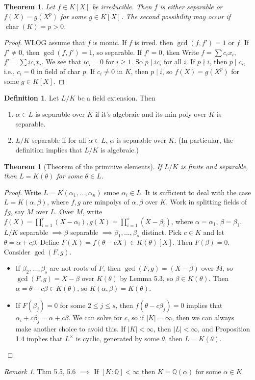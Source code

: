\documentclass{article}
\theoremstyle{definition}
\newtheorem*{defn*}{Definition}
\theoremstyle{remark}
\newtheorem{rem}{Remark}
\theoremstyle{plain}
\newtheorem{thm}[defn]{Theorem}
\newcommand{\QQ}{\mathbb{Q}}
\begin{document}
\begin{thm}
Let $f\in K[X]$ be irreducible. Then $f$ is either separable or $f(X)=g(X^p)$ for some $g\in K[X]$. The second possibility may occur if $\operatorname{char}(K)=p>0$.
\end{thm}
\begin{proof}
    WLOG assume that $f$ is monic. If $f$ is irred. then $\gcd(f,f')=1$ or $f$. If $f'\neq 0$, then $\gcd(f,f')=1$, so separable. If $f'=0$, then Write $f=\sum c_ix_i$, $f'=\sum ic_ix_i$. We see that $ic_i=0$ for $i\ge 1$. So $p\mid ic_i$ for all $i$. If $p\nmid i$, then $p\mid c_i$, i.e., $c_i=0$ in field of char $p$. If $c_i\neq 0$ in $K$, then $p\mid i$, so $f(X)=g(X^p)$ for some $g\in K[X]$.
\end{proof}
\begin{defn*}
    Let $L/K$ be a field extension. Then
    \begin{enumerate}
        \item $\alpha\in L$ is separable over $K$ if it's algebraic and its min poly over $K$ is separable.
        \item $L/K$ separable if for all $\alpha\in L$, $\alpha$ is separable over $K$. (In particular, the definition implies that $L/K$ is algebraic.)
    \end{enumerate}
\end{defn*}
\begin{thm}[Theorem of the primitive elements]
    If $L/K$ is finite and separable, then $L=K(\theta)$ for some $\theta\in L$.
\end{thm}
\begin{proof}
Write $L=K(\alpha_1,...,\alpha_n)$ smoe $\alpha_i\in L$. It is sufficient to deal with the case $L=K(\alpha,\beta)$, where $f,g$ are minpolys of $\alpha,\beta$ over $K$. Work in splitting fields of $fg$, say $M$ over $L$. Over $M$, write $f(X)=\prod_{i=1}^r(X-\alpha_i),g(X)=\prod_{i=1}^s(X-\beta_i)$, where $\alpha=\alpha_1$, $\beta=\beta_1$.
$L/K$ separable $\implies \beta$ separable $\implies \beta_1,...,\beta_s$ distinct. Pick $c\in K$ and let $\theta=\alpha+c\beta$. Define $F(X)=f(\theta-cX)\in K(\theta)[X]$. Then $F(\beta)=0$.
Consider $\gcd(F,g)$.
\begin{itemize}
    \item If $\beta_2,...,\beta_s$ are not roots of $F$, then $\gcd(F,g)=(X-\beta)$ over $M$, so $\gcd(F,g)=X-\beta$ over $K(\theta)$ by Lemma 5.3, so $\beta\in K(\theta)$. Then $\alpha=\theta-c\beta\in K(\theta)$, so $K(\alpha,\beta)=K(\theta)$.
    \item If $F(\beta_j)=0$ for some $2\le j\le s$, then $f(\theta-c\beta_j)=0$ implies that $\alpha_i+c\beta_j=\alpha+c\beta$. We can solve for $c$, so if $|K|=\infty$, then we can always make another choice to avoid this. If $|K|<\infty$, then $|L|<\infty$, and Proposition 1.4 implies that $L^\times $ is cyclic, generated by some $\theta$, then $L=K(\theta)$.
\end{itemize}
\end{proof}
\begin{rem}
    Thm 5.5, 5.6 $\implies$ If $[K:\QQ]<\infty$ then $K=\QQ(\alpha)$ for some $\alpha\in K$.
\end{rem}
\end{document}
